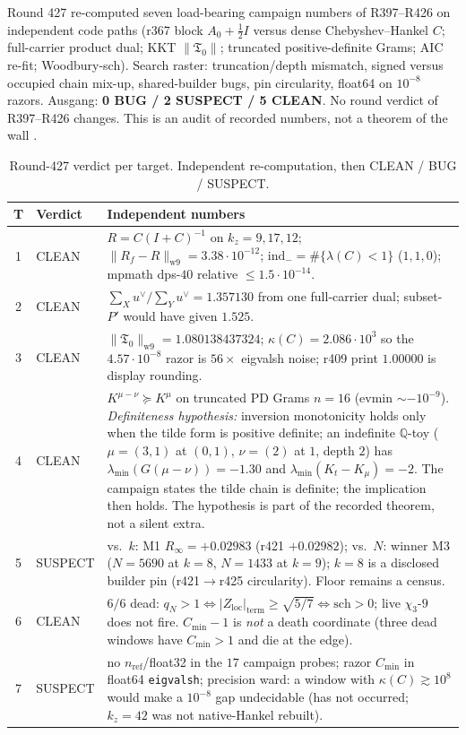 \documentclass[11pt]{article}
\theoremstyle{remark}
\newcommand{\half}{\tfrac12}
\newcommand{\Tfrak}{\mathfrak{T}}
\newcommand{\Zloc}{Z_{\mathrm{loc}}}
\begin{document}
Round 427 re-computed seven load-bearing campaign numbers of
R397--R426 on independent code paths (r367 block
$A_{0}+\half I$ versus dense Chebyshev--Hankel $C$;
full-carrier product dual; KKT $\|\Tfrak_{0}\|$; truncated
positive-definite Grams; AIC re-fit; Woodbury-sch).  Search
raster: truncation/depth mismatch, signed versus occupied
chain mix-up, shared-builder bugs, pin circularity, float64
on $10^{-8}$ razors.  Ausgang:
\textbf{0 BUG / 2 SUSPECT / 5 CLEAN}.
No round verdict of R397--R426 changes.  This is an audit of
recorded numbers, not a theorem of the wall
\cite{campaign-audit}.

\begin{table}[ht]
\centering
\caption{Round-427 verdict per target.  Independent
re-computation, then CLEAN / BUG / SUSPECT.}
\label{tab:audit}
{\small
\begin{tabular}{@{}clp{8.2cm}@{}}
\toprule
T & Verdict & Independent numbers \\
\midrule
1 & CLEAN
  & $R=C(I+C)^{-1}$ on $k_{z}=9,17,12$;
    $\|R_{f}-R\|_{\mathrm{w9}}=3.38\cdot10^{-12}$;
    $\mathrm{ind}_{-}=\#\{\lambda(C)<1\}$ ($1,1,0$);
    mpmath dps-$40$ relative $\le1.5\cdot10^{-14}$. \\
2 & CLEAN
  & $\sum_{X}u^{\vee}/\sum_{Y}u^{\vee}=1.357130$ from one
    full-carrier dual; subset-$P'$ would have given $1.525$. \\
3 & CLEAN
  & $\|\Tfrak_{0}\|_{\mathrm{w9}}=1.080138437324$;
    $\kappa(C)=2.086\cdot10^{3}$ so the
    $4.57\cdot10^{-8}$ razor is $56\times$ eigvalsh noise;
    r409 print $1.00000$ is display rounding. \\
4 & CLEAN
  & $K^{\mu-\nu}\succeq K^{\mu}$ on truncated PD Grams $n=16$
    (evmin $\sim-10^{-9}$).
    \emph{Definiteness hypothesis:} inversion monotonicity
    holds only when the tilde form is positive definite;
    an indefinite $\mathbb{Q}$-toy
    ($\mu=(3,1)$ at $(0,1)$, $\nu=(2)$ at $1$, depth $2$)
    has $\lambda_{\min}(G(\mu-\nu))=-1.30$ and
    $\lambda_{\min}(K_{t}-K_{\mu})=-2$.  The campaign states
    the tilde chain is definite; the implication then holds.
    The hypothesis is part of the recorded theorem, not a
    silent extra. \\
5 & SUSPECT
  & vs.\ $k$: M1 $R_{\infty}=+0.02983$ (r421 $+0.02982$);
    vs.\ $N$: winner M3 ($N=5690$ at $k=8$, $N=1433$ at $k=9$);
    $k=8$ is a disclosed builder pin (r421$\to$r425
    circularity).  Floor remains a census. \\
6 & CLEAN
  & $6/6$ dead:
    $q_{N}>1\Leftrightarrow|\Zloc|_{\mathrm{term}}\ge\sqrt{5/7}
    \Leftrightarrow\mathrm{sch}>0$;
    live $\chi_{3}$-$9$ does not fire.
    $C_{\min}-1$ is \emph{not} a death coordinate
    (three dead windows have $C_{\min}>1$ and die at the
    edge). \\
7 & SUSPECT
  & no $n_{\mathrm{ref}}$/float32 in the $17$ campaign probes;
    razor $C_{\min}$ in float64 \texttt{eigvalsh};
    precision ward: a window with $\kappa(C)\gtrsim10^{8}$
    would make a $10^{-8}$ gap undecidable
    (has not occurred; $k_{z}=42$ was not native-Hankel
    rebuilt). \\
\bottomrule
\end{tabular}}
\end{table}
\end{document}
